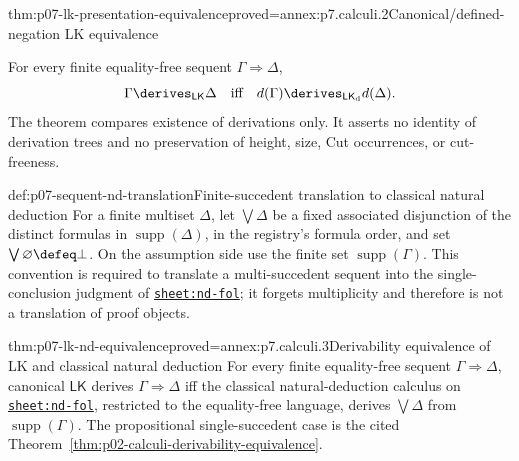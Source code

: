 \begin{hbtheorem}{thm:p07-lk-presentation-equivalence}{proved=annex:p7.calculi.2}{Canonical/defined-negation LK equivalence}
\par\noindent
For every finite equality-free sequent \(\Gamma\Rightarrow\Delta\),
\[
 \Gamma\derives_{\mathsf{LK}}\Delta
 \quad\text{iff}\quad
 d(\Gamma)\derives_{\mathsf{LK}_{\mathrm d}}d(\Delta).
\]
The theorem compares existence of derivations only.  It asserts no identity
of derivation trees and no preservation of height, size, Cut occurrences, or
cut-freeness.
\end{hbtheorem}

\begin{hbdefinition}{def:p07-sequent-nd-translation}{Finite-succedent translation to classical natural deduction}
For a finite multiset \(\Delta\), let \(\bigvee\Delta\) be a fixed associated
disjunction of the distinct formulas in \(\operatorname{supp}(\Delta)\), in
the registry's formula order, and set
\(\bigvee\varnothing\defeq\bot\).  On the assumption side use the finite set
\(\operatorname{supp}(\Gamma)\).  This convention is required to translate
a multi-succedent sequent into the single-conclusion judgment of
\hyperref[sheet:nd-fol]{\texttt{sheet:nd-fol}}; it forgets multiplicity and
therefore is not a translation of proof objects.
\end{hbdefinition}

\begin{hbtheorem}{thm:p07-lk-nd-equivalence}{proved=annex:p7.calculi.3}{Derivability equivalence of LK and classical natural deduction}
For every finite equality-free sequent \(\Gamma\Rightarrow\Delta\), canonical
\(\mathsf{LK}\) derives \(\Gamma\Rightarrow\Delta\) iff the classical
natural-deduction calculus on
\hyperref[sheet:nd-fol]{\texttt{sheet:nd-fol}}, restricted to the
equality-free language, derives \(\bigvee\Delta\) from
\(\operatorname{supp}(\Gamma)\).  The propositional single-succedent case is
the cited Theorem~\ref{thm:p02-calculi-derivability-equivalence}.
\end{hbtheorem}

